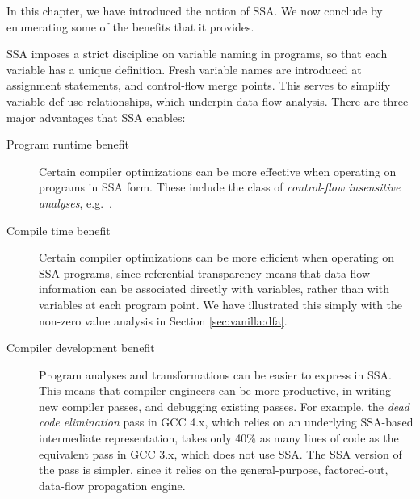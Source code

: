 In this chapter, we have introduced the notion of SSA.
We now conclude by enumerating some of the benefits 
that it provides.

SSA imposes a strict discipline on variable naming in programs,
so that each variable has a unique definition.
Fresh variable names are introduced at assignment statements,
and control-flow merge points.
This serves to simplify variable def-use relationships,
which underpin data flow analysis.
There are three major advantages that SSA enables:
\begin{description}
\item[Program runtime benefit]
Certain compiler optimizations can be more effective
when operating on programs in SSA form. These include the
class of \textit{control-flow insensitive analyses}, e.g.\
\cite{hasti98using}.
\item[Compile time benefit]
Certain compiler optimizations can be more efficient
when operating on SSA programs, since
referential transparency means that data flow information
can be associated directly with variables, rather than with variables
at each program point. We have illustrated this simply with the
non-zero value analysis in Section \ref{sec:vanilla:dfa}.
\item[Compiler development benefit]
Program analyses and transformations can be easier
to express in SSA. This means that compiler engineers
can be more productive, in writing new compiler passes,
and debugging existing passes.
For example, the \textit{dead code elimination} pass
in GCC 4.x, which relies on an underlying SSA-based intermediate
representation, takes only 40\% as many lines of code
as the equivalent pass in GCC 3.x, which does not use SSA.
The SSA version of the pass is simpler, since it
relies on the general-purpose, factored-out, data-flow propagation
engine.
\end{description}



